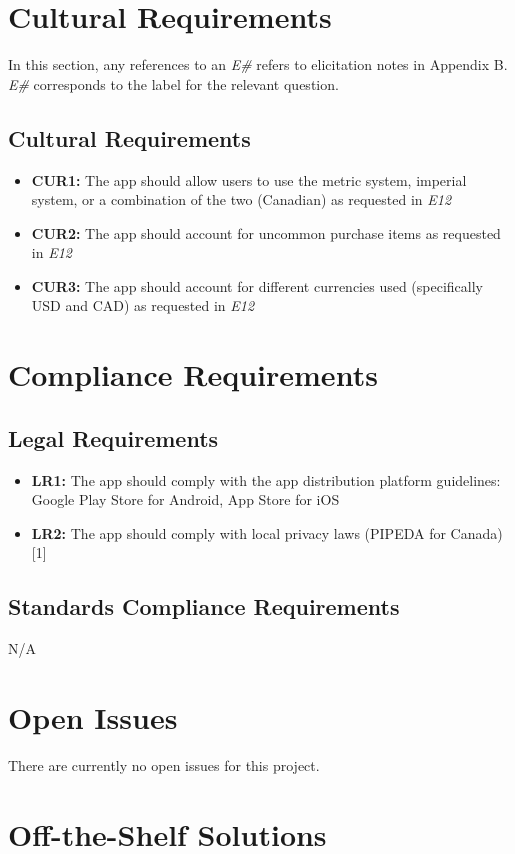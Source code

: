 \documentclass[12pt]{article}
\begin{document}
\section{Cultural Requirements}
In this section, any references to an \textit{E\#} refers to elicitation notes in Appendix B. \textit{E\#} corresponds to the label for the relevant question.
\subsection{Cultural Requirements}
\begin{itemize}
    \item \textbf{CUR1:} The app should allow users to use the metric system, imperial system, or a combination of the two (Canadian) as requested in \textit{E12}
    \item \textbf{CUR2:} The app should account for uncommon purchase items as requested in \textit{E12}
    \item \textbf{CUR3:} The app should account for different currencies used (specifically USD and CAD) as requested in \textit{E12}
\end{itemize}

\section{Compliance Requirements}
\subsection{Legal Requirements}
\begin{itemize}
    \item \textbf{LR1:} The app should comply with the app distribution platform guidelines: Google Play Store for Android, App Store for iOS
    \item \textbf{LR2:} The app should comply with local privacy laws (PIPEDA for Canada) [1]
\end{itemize}
\subsection{Standards Compliance Requirements}
N/A

\section{Open Issues}
There are currently no open issues for this project.

\section{Off-the-Shelf Solutions}
\end{document}
